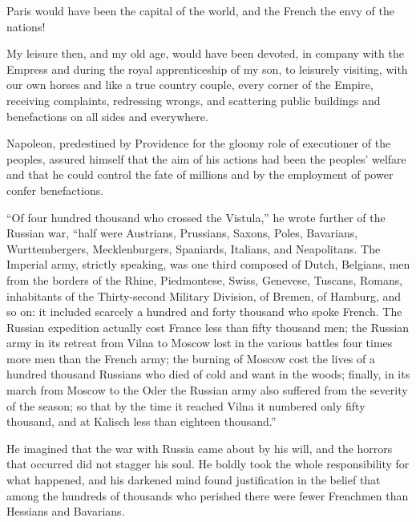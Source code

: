 Paris would have been the capital of the world, and the French
the envy of the nations!

My leisure then, and my old age, would have been devoted, in
company with the Empress and during the royal apprenticeship of
my son, to leisurely visiting, with our own horses and like a
true country couple, every corner of the Empire, receiving
complaints, redressing wrongs, and scattering public buildings
and benefactions on all sides and everywhere.

Napoleon, predestined by Providence for the gloomy role of
executioner of the peoples, assured himself that the aim of his
actions had been the peoples' welfare and that he could control
the fate of millions and by the employment of power confer
benefactions.

``Of four hundred thousand who crossed the Vistula,'' he wrote
further of the Russian war, ``half were Austrians, Prussians,
Saxons, Poles, Bavarians, Wurttembergers, Mecklenburgers,
Spaniards, Italians, and Neapolitans. The Imperial army, strictly
speaking, was one third composed of Dutch, Belgians, men from the
borders of the Rhine, Piedmontese, Swiss, Genevese, Tuscans,
Romans, inhabitants of the Thirty-second Military Division, of
Bremen, of Hamburg, and so on: it included scarcely a hundred and
forty thousand who spoke French. The Russian expedition actually
cost France less than fifty thousand men; the Russian army in its
retreat from Vilna to Moscow lost in the various battles four
times more men than the French army; the burning of Moscow cost
the lives of a hundred thousand Russians who died of cold and
want in the woods; finally, in its march from Moscow to the Oder
the Russian army also suffered from the severity of the season;
so that by the time it reached Vilna it numbered only fifty
thousand, and at Kalisch less than eighteen thousand.''

He imagined that the war with Russia came about by his will, and
the horrors that occurred did not stagger his soul. He boldly
took the whole responsibility for what happened, and his darkened
mind found justification in the belief that among the hundreds of
thousands who perished there were fewer Frenchmen than Hessians
and Bavarians.


